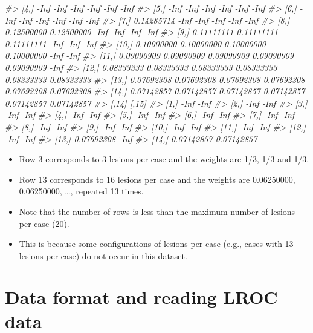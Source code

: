 \documentclass[
]{book}
\newenvironment{Shaded}{\begin{snugshade}}{\end{snugshade}}
\newcommand{\CommentTok}[1]{\textcolor[rgb]{0.56,0.35,0.01}{\textit{#1}}}
\providecommand{\tightlist}{%
  \setlength{\itemsep}{0pt}\setlength{\parskip}{0pt}}
\begin{document}
\begin{Shaded}
\begin{Highlighting}[]
\CommentTok{#>  [4,]       -Inf       -Inf       -Inf       -Inf       -Inf       -Inf}
\CommentTok{#>  [5,]       -Inf       -Inf       -Inf       -Inf       -Inf       -Inf}
\CommentTok{#>  [6,]       -Inf       -Inf       -Inf       -Inf       -Inf       -Inf}
\CommentTok{#>  [7,] 0.14285714       -Inf       -Inf       -Inf       -Inf       -Inf}
\CommentTok{#>  [8,] 0.12500000 0.12500000       -Inf       -Inf       -Inf       -Inf}
\CommentTok{#>  [9,] 0.11111111 0.11111111 0.11111111       -Inf       -Inf       -Inf}
\CommentTok{#> [10,] 0.10000000 0.10000000 0.10000000 0.10000000       -Inf       -Inf}
\CommentTok{#> [11,] 0.09090909 0.09090909 0.09090909 0.09090909 0.09090909       -Inf}
\CommentTok{#> [12,] 0.08333333 0.08333333 0.08333333 0.08333333 0.08333333 0.08333333}
\CommentTok{#> [13,] 0.07692308 0.07692308 0.07692308 0.07692308 0.07692308 0.07692308}
\CommentTok{#> [14,] 0.07142857 0.07142857 0.07142857 0.07142857 0.07142857 0.07142857}
\CommentTok{#>            [,14]      [,15]}
\CommentTok{#>  [1,]       -Inf       -Inf}
\CommentTok{#>  [2,]       -Inf       -Inf}
\CommentTok{#>  [3,]       -Inf       -Inf}
\CommentTok{#>  [4,]       -Inf       -Inf}
\CommentTok{#>  [5,]       -Inf       -Inf}
\CommentTok{#>  [6,]       -Inf       -Inf}
\CommentTok{#>  [7,]       -Inf       -Inf}
\CommentTok{#>  [8,]       -Inf       -Inf}
\CommentTok{#>  [9,]       -Inf       -Inf}
\CommentTok{#> [10,]       -Inf       -Inf}
\CommentTok{#> [11,]       -Inf       -Inf}
\CommentTok{#> [12,]       -Inf       -Inf}
\CommentTok{#> [13,] 0.07692308       -Inf}
\CommentTok{#> [14,] 0.07142857 0.07142857}
\end{Highlighting}
\end{Shaded}

\begin{itemize}
\tightlist
\item
  Row 3 corresponds to 3 lesions per case and the weights are 1/3, 1/3 and 1/3.
\item
  Row 13 corresponds to 16 lesions per case and the weights are 0.06250000, 0.06250000, \ldots, repeated 13 times.
\item
  Note that the number of rows is less than the maximum number of lesions per case (20).
\item
  This is because some configurations of lesions per case (e.g., cases with 13 lesions per case) do not occur in this dataset.
\end{itemize}

\hypertarget{quick-start-lroc-data}{%
\chapter{Data format and reading LROC data}\label{quick-start-lroc-data}}
\end{document}
